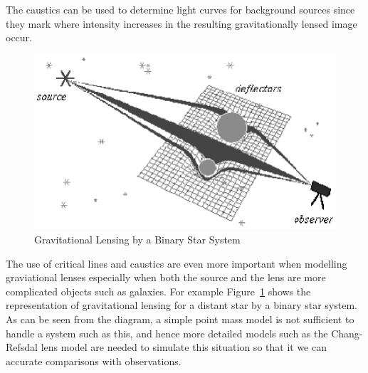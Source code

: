 \documentclass[a4paper]{IEEEtran}
\newcommand{\showcode}[1]{\begin{mdframed}[style=code] %
                          \end{mdframed}%
}
\newcommand{\showccode}[1]{\begin{mdframed}[style=code] %
                          \end{mdframed}%
}
\begin{document}
    The caustics can be used to determine light curves for background
    sources since they mark where intensity increases in the resulting
    gravitationally lensed image occur.

    \begin{figure}
        \caption{Gravitational Lensing by a Binary Star System}
        \label{fig:binary-star} 
        \begin{center}
            \includegraphics[width=\columnwidth]{images/lens_model.eps}
        \end{center}
    \end{figure}

    The use of critical lines and caustics are even more important
    when modelling graviational lenses especially when both the source
    and the lens are more complicated objects such as galaxies.
    For example Figure~\ref{fig:binary-star} shows the representation of 
    gravitational lensing for a distant star by a binary star system.
    As can be seen from the diagram, a simple point mass model is
    not sufficient to handle a system such as this, and hence
    more detailed models such as the Chang-Refsdal lens model
    are needed to simulate this situation so that it we can accurate
    comparisons with observations.


\onecolumn

\showcode{src/caustics.f} 

\showcode{src/lense.f} 

\showccode{src/image.c}

\end{document}
